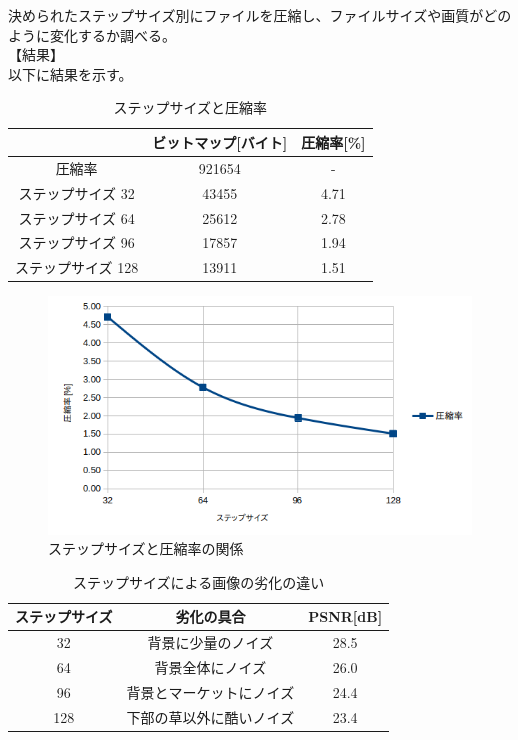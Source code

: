 \documentclass[uplatex, titlepage]{jsarticle}
\begin{document}
  決められたステップサイズ別にファイルを圧縮し、ファイルサイズや画質がどのように変化するか調べる。\\
【結果】\\
  以下に結果を示す。\\

\begin{table}
  \centering
  \caption{ステップサイズと圧縮率}
  \label{table:stepasyuku}
  \begin{tabular}{|c|c|c|} \hline
    & ビットマップ[バイト] & 圧縮率[\%] \\ \hline
    圧縮率 & 921654 & - \\ \hline
    ステップサイズ 32 & 43455 & 4.71 \\ \hline
    ステップサイズ 64 & 25612 & 2.78 \\ \hline
    ステップサイズ 96 & 17857 & 1.94 \\ \hline
    ステップサイズ 128 & 13911 & 1.51 \\ \hline
  \end{tabular}
\end{table}

\begin{figure}[H]
  \centering
  \includegraphics[scale=0.6]{./grahh2.png}
  \caption{ステップサイズと圧縮率の関係}
  \label{fig:step}
\end{figure}

\begin{table}[H]
  \centering
  \caption{ステップサイズによる画像の劣化の違い}
  \label{table:steprekka}
  \begin{tabular}{|c|c|c|} \hline
    ステップサイズ & 劣化の具合 & PSNR[dB] \\ \hline
    32 & 背景に少量のノイズ & 28.5 \\ \hline
    64 & 背景全体にノイズ & 26.0 \\ \hline
    96 & 背景とマーケットにノイズ & 24.4 \\ \hline
    128 & 下部の草以外に酷いノイズ & 23.4 \\ \hline
  \end{tabular}
\end{table}
\end{document}
